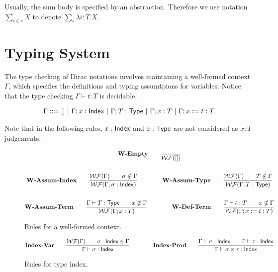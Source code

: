 \documentclass{article}
\begin{document}
Usually, the sum body is specified by an abstraction. Therefore we use notation $\sum_{i \in s} X$ to denote $\sum_{s} \lambda i : T . X$.
 
\section{Typing System}
The type checking of Dirac notations involves maintaining a well-formed context $\Gamma$, which specifies the definitions and typing assumtpions for variables.
Notice that the type checking $\Gamma \vdash t : T$ is decidable.

\begin{definition}[context]
    \begin{align*}
        \Gamma ::= []\ |\ \Gamma; x : \Index\ |\ \Gamma; T : \Type\ |\ \Gamma; x : T\ |\ \Gamma; x := t : T.
    \end{align*}
\end{definition}

Note that in the following rules, $x : \mathsf{Index}$ and $x : \mathsf{Type}$ are not considered as $x : T$ judgements.

\begin{figure}[h]
    \begin{gather*}
        \textbf{W-Empty} \qquad
        \frac{}{\mathcal{WF}([])} \\
        \\
        \textbf{W-Assum-Index} \qquad
        \frac{\mathcal{WF}(\Gamma) \qquad \sigma \notin \Gamma}{\mathcal{WF}(\Gamma; \sigma : \mathsf{Index})}\qquad \qquad
        \textbf{W-Assum-Type} \qquad
        \frac{\mathcal{WF}(\Gamma) \qquad T \notin \Gamma}{\mathcal{WF}(\Gamma; T : \mathsf{Type})} \\
        \\
        \textbf{W-Assum-Term} \qquad
        \frac{\Gamma \vdash T : \mathsf{Type} \qquad x \notin \Gamma}{\mathcal{WF}(\Gamma; x:T)}
        \qquad \qquad
        \textbf{W-Def-Term} \qquad
        \frac{\Gamma\vdash t:T \qquad x \notin \Gamma}{\mathcal{WF}(\Gamma; x:=t:T)}
    \end{gather*}
    \caption{Rules for a well-formed context.}
\end{figure}

\begin{figure}
    \begin{gather*}
        \textbf{Index-Var} \qquad
        \frac{\mathcal{WF}(\Gamma) \qquad \sigma : \mathsf{Index} \in \Gamma}{\Gamma \vdash \sigma : \mathsf{Index}}
        \qquad \qquad
        \textbf{Index-Prod} \qquad
        \frac{\Gamma \vdash \sigma : \mathsf{Index} \qquad \Gamma \vdash \tau : \mathsf{Index}}{\Gamma \vdash \sigma \times \tau : \mathsf{Index}}
    \end{gather*}
    \caption{Rules for type index.}
\end{figure}
\end{document}
